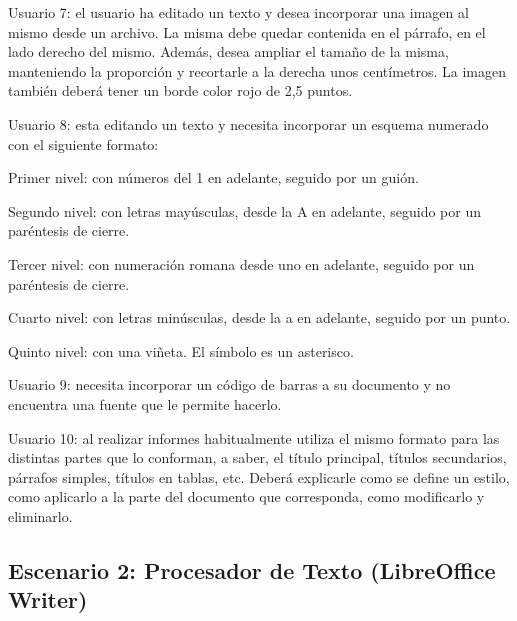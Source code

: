 \documentclass[12pt]{article}
\begin{document}
\begin{description}
    \item{Usuario 7}: el usuario ha editado un texto y desea incorporar una
    imagen al mismo desde un archivo. La misma debe quedar contenida en el
    párrafo, en el lado derecho del mismo. Además, desea ampliar el tamaño de
    la misma, manteniendo la proporción y recortarle a la derecha unos
    centímetros. La imagen también deberá tener un borde color rojo de 2,5
    puntos.

    \item{Usuario 8}: esta editando un texto y necesita incorporar un esquema
    numerado con el siguiente formato:

    \begin{description}

        \item{Primer nivel}: con números del 1 en adelante, seguido por un
        guión.

        \item{Segundo nivel}: con letras mayúsculas, desde la A en adelante,
        seguido por un paréntesis de cierre.

        \item{Tercer nivel}: con numeración romana desde uno en adelante,
        seguido por un paréntesis de cierre.

        \item{Cuarto nivel}: con letras minúsculas, desde la a en adelante,
        seguido por un punto.

        \item{Quinto nivel}: con una viñeta. El símbolo es un asterisco.

    \end{description}

    \item{Usuario 9}: necesita incorporar un código de barras a su documento y
    no encuentra una fuente que le permite hacerlo.

    \item{Usuario 10}: al realizar informes habitualmente utiliza el mismo
    formato para las distintas partes que lo conforman, a saber, el título
    principal, títulos secundarios, párrafos simples, títulos en tablas, etc.
    Deberá explicarle como se define un estilo, como aplicarlo a la parte del
    documento que corresponda, como modificarlo y eliminarlo.

\end{description}

\subsection*{Escenario 2: Procesador de Texto (LibreOffice Writer)}
\end{document}
